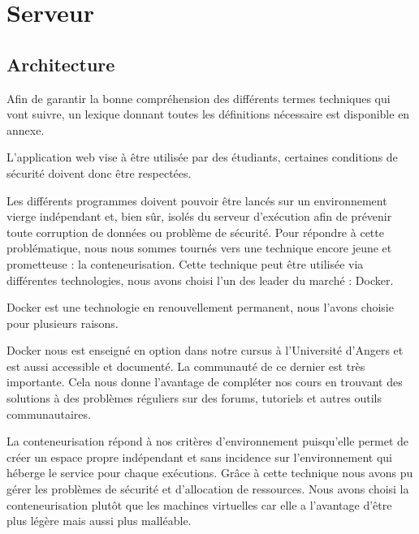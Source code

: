 \chapter{Serveur}

\section{Architecture}

\par Afin de garantir la bonne compréhension des différents termes techniques qui vont suivre, un lexique donnant toutes les définitions nécessaire est disponible en annexe.
\\

\par L’application web vise à être utilisée par des étudiants, certaines conditions de sécurité doivent donc être respectées.
 
\par Les différents programmes doivent pouvoir être lancés sur un environnement vierge indépendant et, bien sûr, isolés du serveur d’exécution afin de prévenir toute corruption de données ou problème de sécurité. Pour répondre à cette problématique, nous nous sommes tournés vers une technique encore jeune et prometteuse : la conteneurisation. Cette technique peut être utilisée via différentes technologies, nous avons choisi l’un des leader du marché : Docker.

\par Docker est une technologie en renouvellement permanent, nous l'avons choisie pour plusieurs raisons.
\par Docker nous est enseigné en option dans notre cursus à l’Université d'Angers et est aussi accessible et documenté. La communauté de ce dernier est très importante. Cela nous donne l’avantage de compléter nos cours en trouvant des solutions à des problèmes réguliers sur des forums, tutoriels et autres outils communautaires.
\\

\par La conteneurisation répond à nos critères d’environnement puisqu’elle permet de créer un espace propre indépendant et sans incidence sur l’environnement qui héberge le \gls{service} pour chaque exécutions. Grâce à cette technique nous avons pu gérer les problèmes de sécurité et d’allocation de ressources. Nous avons choisi la conteneurisation plutôt que les machines virtuelles car elle a l’avantage d’être plus légère mais aussi plus malléable.  


